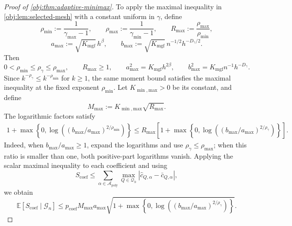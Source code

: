 \documentclass[11pt]{article}
\begin{document}
\begin{proof}[Proof of \cref{obj:thm:adaptive-minimax}]
To apply the maximal inequality in \cref{obj:lem:selected-mesh} with a constant uniform in \(\gamma\), define
\[
\rho_{\min}:=\frac1{\gamma_{\max}-1},
\qquad
\rho_{\max}:=\frac1{\gamma_{\min}-1},
\qquad
R_{\mathrm{max}}:=\frac{\rho_{\max}}{\rho_{\min}},
\]
\[
a_{\mathrm{max}}:=\sqrt{K_{\mathrm{mgf}}}\,h^\beta,
\qquad
b_{\mathrm{max}}:=\sqrt{K_{\mathrm{mgf}}}\,n^{-1/2}h^{-D_\gamma/2}.
\]
Then
\[
0<\rho_{\min}\le\rho_\gamma\le\rho_{\max},
\qquad R_{\mathrm{max}}\ge1,
\qquad
 a_{\mathrm{max}}^2=K_{\mathrm{mgf}}h^{2\beta},
\qquad
 b_{\mathrm{max}}^2=K_{\mathrm{mgf}}n^{-1}h^{-D_\gamma}.
\]
Since \(k^{-\rho_\gamma}\le k^{-\rho_{\min}}\) for \(k\ge1\), the same moment bound satisfies the maximal inequality at the fixed exponent \(\rho_{\min}\). Let \(K_{\min,\mathrm{max}}>0\) be its constant, and define
\[
M_{\mathrm{max}}:=K_{\min,\mathrm{max}}\sqrt{R_{\mathrm{max}}}.
\]
The logarithmic factors satisfy
\[
\begin{aligned}
1+\max\left\{0,\log\left(
 (b_{\mathrm{max}}/a_{\mathrm{max}})^{2/\rho_{\min}}
\right)\right\}
\le R_{\mathrm{max}}\left[
1+\max\left\{0,\log\left(
 (b_{\mathrm{max}}/a_{\mathrm{max}})^{2/\rho_\gamma}
\right)\right\}\right].
\end{aligned}
\]
Indeed, when \(b_{\mathrm{max}}/a_{\mathrm{max}}\ge1\), expand the logarithms and use \(\rho_\gamma\le\rho_{\max}\); when this ratio is smaller than one, both positive-part logarithms vanish. Applying the scalar maximal inequality to each coefficient and using
\[
S_{\mathrm{coef}}
\le\sum_{\alpha\in\mathcal A_{\mathrm{poly}}}
\max_{Q\in\mathcal Q_h}
|\widehat c_{Q,\alpha}-\bar c_{Q,\alpha}|,
\]
we obtain
\[
\mathbb E[S_{\mathrm{coef}}\mid\mathcal G_n]
\le p_{\mathrm{coef}}M_{\mathrm{max}}a_{\mathrm{max}}
\sqrt{1+\max\left\{0,\log\left(
(b_{\mathrm{max}}/a_{\mathrm{max}})^{2/\rho_\gamma}
\right)\right\}}.
\]


\end{proof}
\end{document}
